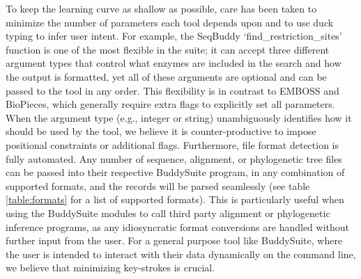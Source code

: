 \documentclass[nogrid]{MBE_article}%
\begin{document}
To keep the learning curve as shallow as possible, care has been taken to minimize the number of parameters each tool depends upon and to use duck typing to infer user intent. For example, the SeqBuddy `find\_restriction\_sites' function is one of the most flexible in the suite; it can accept three different argument types that control what enzymes are included in the search and how the output is formatted, yet all of these arguments are optional and can be passed to the tool in any order. This flexibility is in contrast to EMBOSS and BioPieces, which generally require extra flags to explicitly set all parameters. When the argument type (e.g., integer or string) unambiguously identifies how it should be used by the tool, we believe it is counter-productive to impose positional constraints or additional flags. Furthermore, file format detection is fully automated. Any number of sequence, alignment, or phylogenetic tree files can be passed into their respective BuddySuite program, in any combination of supported formats, and the records will be parsed seamlessly (see table \ref{table:formats} for a list of supported formats). This is particularly useful when using the BuddySuite modules to call third party alignment or phylogenetic inference programs, as any idiosyncratic format conversions are handled without further input from the user. For a general purpose tool like BuddySuite, where the user is intended to interact with their data dynamically on the command line, we believe that minimizing key-strokes is crucial.
\end{document}
